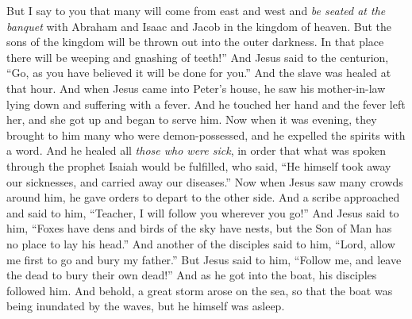 \begin{biblechapter}
\verse But I say to you that many will come from east and west and \textit{be seated at the banquet} with Abraham and Isaac and Jacob in the kingdom of heaven.
\verse But the sons of the kingdom will be thrown out into the outer darkness. In that place there will be weeping and gnashing of teeth!”
\verse And Jesus said to the centurion, “Go, as you have believed it will be done for you.” And the slave was healed at that hour.
 And when Jesus came into Peter’s house, he saw his mother-in-law lying down and suffering with a fever.
\verse And he touched her hand and the fever left her, and she got up and began to serve him.
\verse Now when it was evening, they brought to him many who were demon-possessed, and he expelled the spirits with a word. And he healed all \textit{those who were sick},
\verse in order that what was spoken through the prophet Isaiah would be fulfilled, who said, “He himself took away our sicknesses, 
and carried away our diseases.”
 Now when Jesus saw many crowds around him, he gave orders to depart to the other side.
\verse And a scribe approached and said to him, “Teacher, I will follow you wherever you go!”
\verse And Jesus said to him, “Foxes have dens and birds of the sky have nests, but the Son of Man has no place to lay his head.”
\verse And another of the disciples said to him, “Lord, allow me first to go and bury my father.”
\verse But Jesus said to him, “Follow me, and leave the dead to bury their own dead!”
 And as he got into the boat, his disciples followed him.
\verse And behold, a great storm arose on the sea, so that the boat was being inundated by the waves, but he himself was asleep.

\end{biblechapter}

